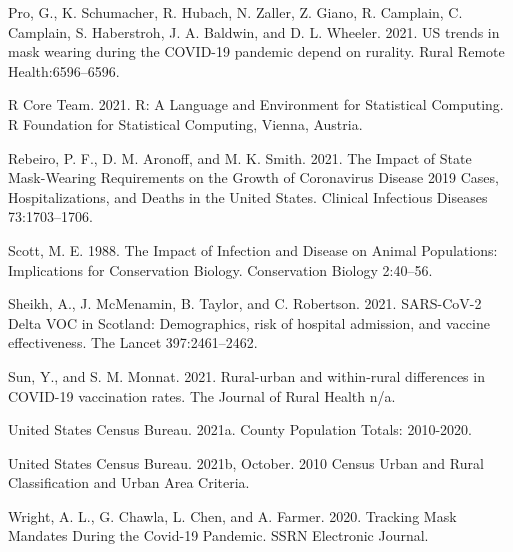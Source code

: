 \documentclass[
  12pt,
]{article}
\newlength{\cslhangindent}
\newlength{\cslentryspacingunit} %
\newenvironment{CSLReferences}[2] %
 {%
  \setlength{\parindent}{0pt}
  \ifodd #1
  \let\oldpar\par
  \def\par{\hangindent=\cslhangindent\oldpar}
  \fi
  \setlength{\parskip}{#2\cslentryspacingunit}
 }%
 {}
\begin{document}
\begin{CSLReferences}{1}{0}
\leavevmode{}%
Pro, G., K. Schumacher, R. Hubach, N. Zaller, Z. Giano, R. Camplain, C. Camplain, S. Haberstroh, J. A. Baldwin, and D. L. Wheeler. 2021. {US} trends in mask wearing during the {COVID}-19 pandemic depend on rurality. Rural Remote Health:6596--6596.

\leavevmode{}%
R Core Team. 2021. R: {A} {Language} and {Environment} for {Statistical} {Computing}. R Foundation for Statistical Computing, Vienna, Austria.

\leavevmode{}%
Rebeiro, P. F., D. M. Aronoff, and M. K. Smith. 2021. The {Impact} of {State} {Mask}-{Wearing} {Requirements} on the {Growth} of {Coronavirus} {Disease} 2019 {Cases}, {Hospitalizations}, and {Deaths} in the {United} {States}. Clinical Infectious Diseases 73:1703--1706.

\leavevmode{}%
Scott, M. E. 1988. The {Impact} of {Infection} and {Disease} on {Animal} {Populations}: {Implications} for {Conservation} {Biology}. Conservation Biology 2:40--56.

\leavevmode{}%
Sheikh, A., J. McMenamin, B. Taylor, and C. Robertson. 2021. {SARS}-{CoV}-2 {Delta} {VOC} in {Scotland}: Demographics, risk of hospital admission, and vaccine effectiveness. The Lancet 397:2461--2462.

\leavevmode{}%
Sun, Y., and S. M. Monnat. 2021. Rural-urban and within-rural differences in {COVID}-19 vaccination rates. The Journal of Rural Health n/a.

\leavevmode{}%
United States Census Bureau. 2021a. County {Population} {Totals}: 2010-2020.

\leavevmode{}%
United States Census Bureau. 2021b, October. 2010 {Census} {Urban} and {Rural} {Classification} and {Urban} {Area} {Criteria}.

\leavevmode{}%
Wright, A. L., G. Chawla, L. Chen, and A. Farmer. 2020. Tracking {Mask} {Mandates} {During} the {Covid}-19 {Pandemic}. SSRN Electronic Journal.

\end{CSLReferences}
\end{document}
